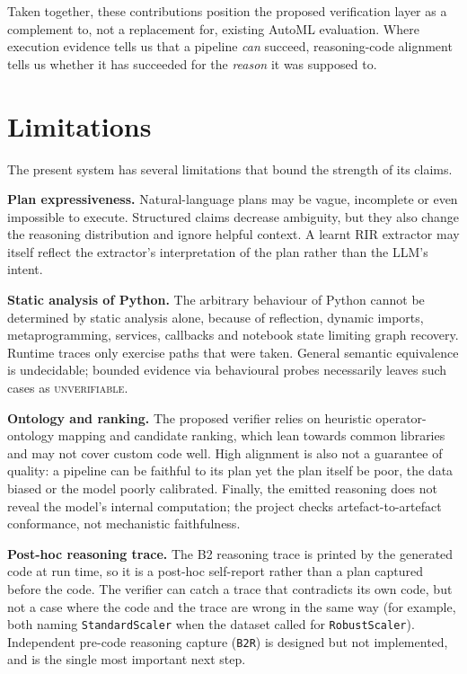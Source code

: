 Taken together, these contributions position the proposed
verification layer as a complement to, not a replacement for, existing
AutoML evaluation. Where execution evidence tells us that a
pipeline \emph{can} succeed, reasoning-code alignment tells us
whether it has succeeded for the \emph{reason} it was supposed to.

\section{Limitations}

The present system has several limitations that bound the strength
of its claims.

\textbf{Plan expressiveness.} Natural-language plans may be vague,
incomplete or even impossible to execute. Structured claims decrease
ambiguity, but they also change the reasoning distribution and
ignore helpful context. A learnt RIR extractor may itself reflect
the extractor's interpretation of the plan rather than the LLM's
intent.

\textbf{Static analysis of Python.} The arbitrary behaviour of
Python cannot be determined by static analysis alone, because of
reflection, dynamic imports, metaprogramming, services, callbacks
and notebook state limiting graph recovery. Runtime traces only
exercise paths that were taken. General semantic equivalence is
undecidable; bounded evidence via behavioural probes necessarily
leaves such cases as \textsc{unverifiable}.

\textbf{Ontology and ranking.} The proposed verifier relies on
heuristic operator-ontology mapping and candidate ranking, which lean
towards common libraries and may not cover custom code well. High
alignment is also not a guarantee of quality: a pipeline can be
faithful to its plan yet the plan itself be poor, the data biased or
the model poorly calibrated. Finally, the emitted reasoning does not
reveal the model's internal computation; the project checks
artefact-to-artefact conformance, not mechanistic faithfulness.

\textbf{Post-hoc reasoning trace.} The B2 reasoning trace is printed
by the generated code at run time, so it is a post-hoc self-report
rather than a plan captured before the code. The verifier can catch a
trace that contradicts its own code, but not a case where the code and
the trace are wrong in the same way (for example, both naming
\texttt{StandardScaler} when the dataset called for
\texttt{RobustScaler}). Independent pre-code reasoning capture
(\texttt{B2R}) is designed but not implemented, and is the single most
important next step.

